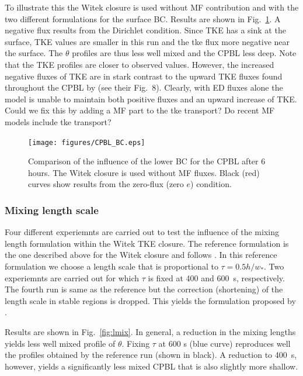 \documentclass[dvipdfmx,a4paper,10pt]{article}
\begin{document}
To illustrate this the Witek closure is used without MF contribution and with the two different formulations for the surface BC. Results are shown in Fig.~\ref{fig:BC}.  A negative flux results from the Dirichlet condition. Since TKE has a sink at the surface, TKE values are smaller in this run and the tke flux more negative near the surface. The $\theta$ profiles are thus less well mixed and the CPBL less deep. Note that the TKE profiles are closer to observed values. However, the increased negative fluxes of TKE are in stark contrast to the upward TKE fluxes found throughout the CPBL by \cite{lenschow74} (see their Fig.~8). Clearly, with ED fluxes alone the model is unable to maintain both positive fluxes and an upward increase of TKE. {\color{blue} Could we fix this by adding a MF part to the tke transport? Do recent MF models include tke transport?}

\begin{figure}[bthp]
\centering
 \texttt{[image: figures/CPBL\_BC.eps]}
\caption{Comparison of the influence of the lower BC for the CPBL after 6 hours. The Witek closure is used without MF fluxes. Black (red) curves show results from the zero-flux (zero $e$) condition. } \label{fig:BC}
\end{figure}

\subsubsection{Mixing length scale}

Four different experiemnts are carried out to test the influence of the mixing length formulation within the Witek TKE closure. The reference formulation is the one described above for the Witek closure and follows \cite{suselj13}. In this reference formulation we choose a length scale that is proportional to $\tau = 0.5 h/w_*$. Two experiemnts are carried out for which $\tau$ is fixed at 400 and 600~s, respectively. The fourth run is same as the reference but the correction (shortening) of the length scale in stable regions is dropped. This yields the formulation proposed by \cite{teixeira04}. 

Results are shown in Fig.~\ref{fig:lmix}. In general, a reduction in the mixing lengths yields less well mixed profile of $\theta$. Fixing $\tau$ at 600 s (blue curve) reproduces well the profiles obtained by the reference run (shown in black). A reduction to 400~s, however, yields a significantly less mixed CPBL that is also slightly more shallow.  
\end{document}
